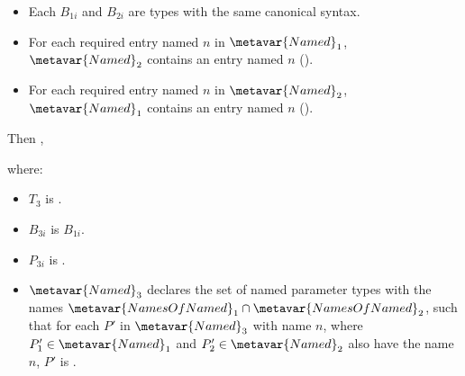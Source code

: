 \documentclass[makeidx]{article}
\begin{document}
\begin{itemize}
  \begin{itemize}
  \item Each $B_{1i}$ and $B_{2i}$ are types with the same canonical syntax.
  \item For each required entry named $n$ in $\metavar{Named}_1$,
    $\metavar{Named}_2$ contains an entry named $n$
    ().
  \item For each required entry named $n$ in $\metavar{Named}_2$,
    $\metavar{Named}_1$ contains an entry named $n$
    ().
  \end{itemize}

  Then ,

  \noindent
  where:

  \begin{itemize}
  \item $T_3$ is .
  \item $B_{3i}$ is $B_{1i}$.
  \item $P_{3i}$ is .
  \item $\metavar{Named}_3$ declares the set
    of named parameter types with the names
    $\metavar{NamesOfNamed}_1\cap\metavar{NamesOfNamed}_2$,
    such that for each $P'$ in $\metavar{Named}_3$ with name $n$,
    where $P'_1 \in \metavar{Named}_1$
    and $P'_2 \in \metavar{Named}_2$
    also have the name $n$,
    $P'$ is .
  \end{itemize}


\end{itemize}
\end{document}
